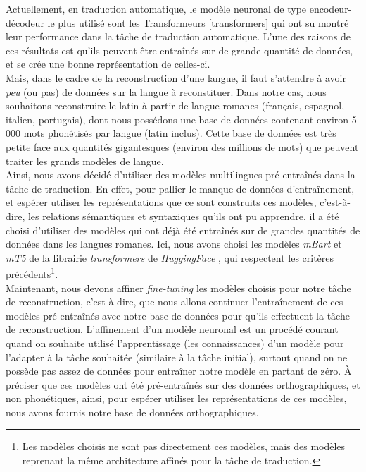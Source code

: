 \documentclass[12pt, twoside]{report}
\begin{document}
\indent Actuellement, en traduction automatique, le modèle neuronal de type encodeur-décodeur le plus utilisé sont les Transformeurs \ref{transformers} qui ont su montré leur performance dans la tâche de traduction automatique. L'une des raisons de ces résultats est qu'ils peuvent être entraînés sur de grande quantité de données, et se crée une \og bonne\fg{} représentation de celles-ci.\\
\indent Mais, dans le cadre de la reconstruction d'une langue, il faut s'attendre à avoir \textit{peu} (ou pas) de données sur la langue à reconstituer. Dans notre cas, nous souhaitons reconstruire le latin à partir de langue romanes (français, espagnol, italien, portugais), dont nous possédons une base de données contenant environ 5 000 mots phonétisés par langue (latin inclus). Cette base de données est très petite face aux quantités gigantesques (environ des millions de mots) que peuvent traiter les grands modèles de langue.\\
\indent Ainsi, nous avons décidé d'utiliser des modèles multilingues pré-entraînés dans la tâche de traduction. En effet, pour pallier le \og manque\fg{} de données d'entraînement, et espérer utiliser les représentations que ce sont construits ces modèles, c'est-à-dire, les relations sémantiques et syntaxiques qu'ils ont pu apprendre, il a été choisi d'utiliser des modèles qui ont déjà été entraînés sur de grandes quantités de données dans les langues romanes. Ici, nous avons choisi les modèles \textit{mBart} \autocite{mbart} et \textit{mT5} \autocite{mt5} de la librairie \textit{transformers} de \textit{HuggingFace} \autocite{hf_lib_transformer}, qui respectent les critères précédents\footnote{Les modèles choisis ne sont pas directement ces modèles, mais des modèles reprenant la même architecture affinés pour la tâche de traduction.}.\\ 
\indent Maintenant, nous devons affiner \textit{fine-tuning} les modèles choisis pour notre tâche de reconstruction, c'est-à-dire, que nous allons continuer l'entraînement de ces modèles pré-entraînés avec notre base de données pour qu'ils effectuent la tâche de reconstruction. L'affinement d'un modèle neuronal est un procédé courant quand on souhaite utilisé l'apprentissage (les connaissances) d'un modèle pour l'adapter à la tâche souhaitée (similaire à la tâche initial), surtout quand on ne possède pas assez de données pour entraîner notre modèle en partant de zéro. À préciser que ces modèles ont été pré-entraînés sur des données orthographiques, et non phonétiques, ainsi, pour espérer utiliser les représentations de ces modèles, nous avons fournis notre base de données orthographiques.\\
\end{document}
